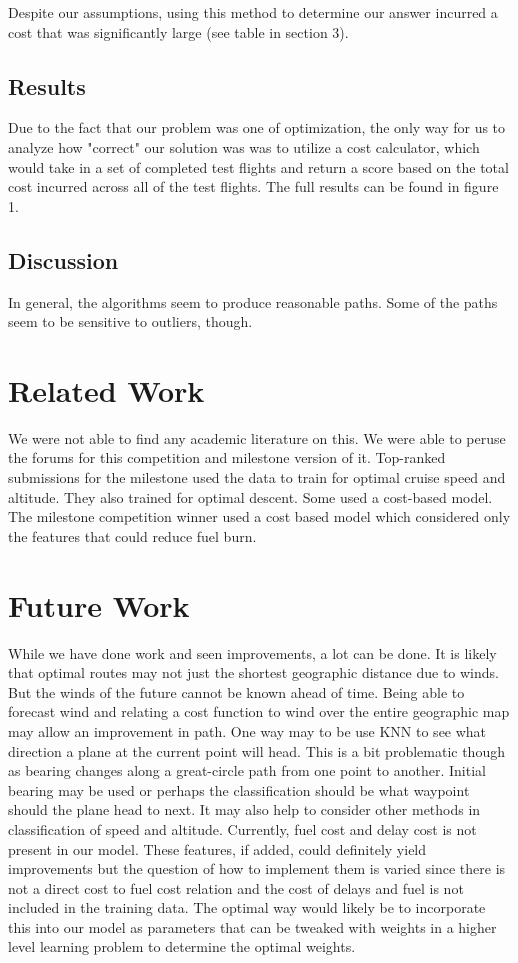 \documentclass{article}[12pt]
\begin{document}
\begin{multicols}{2}
Despite our assumptions, using this method to determine our answer incurred a cost that was significantly large (see table in section 3).


\subsection{Results}
Due to the fact that our problem was one of optimization, the only way for us to analyze how "correct" our solution was was to utilize a cost calculator, which would take in a set of completed test flights and return a score based on the total cost incurred across all of the test flights. The full results can be found in figure 1. 
\subsection{Discussion}
In general, the algorithms seem to produce reasonable paths. Some of the paths seem to be sensitive to outliers, though.
\section{Related Work}
We were not able to find any academic literature on this. We were able to peruse the forums for this competition and milestone version of it. Top-ranked submissions for the milestone used the data to train for optimal cruise speed and altitude. They also trained for optimal descent. Some used a cost-based model. The milestone competition winner used a cost based model which considered only the features that could reduce fuel burn. 

\section{Future Work}
While we have done work and seen improvements, a lot can be done. It is likely that optimal routes may not just the shortest geographic distance due to winds. But the winds of the future cannot be known ahead of time. Being able to forecast wind and relating a cost function to wind over the entire geographic map may allow an improvement in path. One way may to be use KNN to see what direction a plane at the current point will head. This is a bit problematic though as bearing changes along a great-circle path from one point to another. Initial bearing may be used or perhaps the classification should be what waypoint should the plane head to next. It may also help to consider other methods in classification of speed and altitude. Currently, fuel cost and delay cost is not present in our model. These features, if added, could definitely yield improvements but the question of how to implement them is varied since there is not a direct cost to fuel cost relation and the cost of delays and fuel is not included in the training data. The optimal way would likely be to incorporate this into our model as parameters that can be tweaked with weights in a higher level learning problem to determine the optimal weights. \\


\end{multicols}
\end{document}
